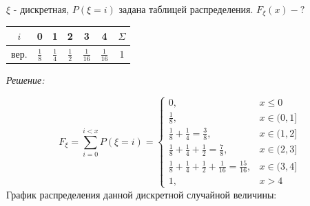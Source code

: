 \begin{exmp}
	$\xi$ - дискретная, $P(\xi = i)$ задана таблицей распределения. $F_{\xi}(x) - ?$
	\begin{table}[H]
		\centering\makegapedcells
		\begin{tabular}{|c|c|c|c|c|c|c|}
			\hline
			$i$  & 0             & 1             & 2             & 3              & 4              & $\Sigma$ \\ \hline
			вер. & $\frac{1}{8}$ & $\frac{1}{4}$ & $\frac{1}{2}$ & $\frac{1}{16}$ & $\frac{1}{16}$ & 1        \\ \hline
		\end{tabular}
	\end{table}
	
	\noindent \textit{Решение:}
	
	\[ F_{\xi} = \sum_{i=0}^{i<x} P(\xi = i) =
	\begin{cases}
	0, &x \le 0 \\
	\frac{1}{8}, &x \in (0,1] \\
	\frac{1}{8} + \frac{1}{4} = \frac{3}{8}, &x \in (1,2] \\
	\frac{1}{8} + \frac{1}{4} + \frac{1}{2} = \frac{7}{8}, &x \in (2,3] \\
	\frac{1}{8} + \frac{1}{4} + \frac{1}{2} + \frac{1}{16} = \frac{15}{16}, &x \in (3,4] \\
	1, &x > 4
	\end{cases}
	\]
	График распределения данной дискретной случайной величины:
	\begin{figure}[H]
	\end{figure}
\end{exmp}

